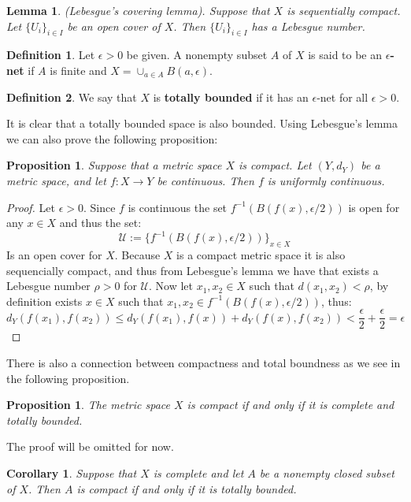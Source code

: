 \documentclass[11pt,a4paper]{article}
\theoremstyle{definition}
\newtheorem{definition}{Definition}[section]
\theoremstyle{plain}
\newtheorem{proposition}[theorem]{Proposition}
\newtheorem{lemma}[theorem]{Lemma}
\newtheorem{corollary}[theorem]{Corollary}
\begin{document}
	\begin{lemma}
		(Lebesgue’s covering lemma). Suppose that $X$ is sequentially 
		compact. Let $\{U_i\}_{i \in I}$ be an open cover of $X$. 
		Then $\{U_i\}_{i \in I}$ has a Lebesgue number.
	\end{lemma}
	\begin{definition}
		Let $\epsilon > 0$ be given. A nonempty subset $A$ of $X$ is 
		said to be an \textbf{$\epsilon$-net} if $A$ is finite and 
		$X = \cup_{a \in A}{B(a, \epsilon)}$.
	\end{definition}
	\begin{definition}
		We say that $X$ is \textbf{totally bounded} if it has an 
		$\epsilon$-net for all $\epsilon > 0$.
	\end{definition}
	It is clear that a totally bounded space is also bounded. 
	Using Lebesgue's lemma we can also prove the following proposition:
	\begin{proposition}
		Suppose that a metric space $X$ is compact. Let $(Y, d_Y)$ be a 
		metric space, and let $f \colon X \to Y$ be continuous. Then $f$ is 
		uniformly continuous.	
	\end{proposition}
	\begin{proof}
		Let $\epsilon > 0$. Since $f$ is continuous the set 
		$f^{-1}(B(f(x),\epsilon/2))$ is open for any $x \in X$ and thus
		the set:
		\[
			\mathcal{U} := \{f^{-1}(B(f(x),\epsilon/2))\}_{x \in X}
		\]
		Is an open cover for $X$. Because $X$ is a compact metric space
		it is also sequencially compact, and thus from Lebesgue's lemma
		we have that exists a Lebesgue number $\rho > 0$ for $\mathcal{U}$.
		Now let $x_1,x_2 \in X$ such that $d(x_1,x_2) < \rho$, by definition
		exists $x \in X$ such that $x_1,x_2 \in f^{-1}(B(f(x),\epsilon/2))$,
		thus:
		\[
			d_Y(f(x_1),f(x_2)) \le d_Y(f(x_1),f(x)) + d_Y(f(x),f(x_2)) <
			\frac{\epsilon}{2} + \frac{\epsilon}{2} = \epsilon
		\]
	\end{proof}
	There is also a connection between compactness and total boundness as
	we see in the following proposition.
	\begin{proposition}
		The metric space $X$ is compact if and only if it is complete
		and totally bounded.
	\end{proposition}
	The proof will be omitted for now.
	\begin{corollary}
		Suppose that $X$ is complete and let $A$ be a nonempty closed subset
		of $X$. Then $A$ is compact if and only if it is totally bounded.
	\end{corollary}
	
\end{document}
